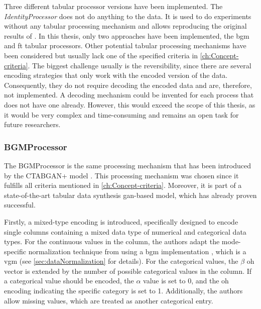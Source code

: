 Three different tabular processor versions have been implemented.
The \textit{IdentityProcessor} does not do anything to the data.
It is used to do experiments without any tabular processing mechanism and allows reproducing the original results of \cite{kotelnikov2022TabDDPMModellingTabular}.
In this thesis, only two approaches have been implemented, the \gls{bgm} and \gls{ft} tabular processors.
Other potential tabular processing mechanisms have been considered but usually lack one of the specified criteria in \autoref{ch:Concept-criteria}.
The biggest challenge usually is the reversibility, since there are several encoding strategies that only work with the encoded version of the data.
Consequently, they do not require decoding the encoded data and are, therefore, not implemented.
A decoding mechanism could be invented for each process that does not have one already.
However, this would exceed the scope of this thesis, as it would be very complex and time-consuming and remains an open task for future researchers.

\subsubsection{BGMProcessor}
\label{ch:BGMProcessor}

The BGMProcessor is the same processing mechanism that has been introduced by the CTABGAN+ model \cite{zhao2022CTABGANEnhancingTabular}.
This processing mechanism was chosen since it fulfills all criteria mentioned in \autoref{ch:Concept-criteria}.
Moreover, it is part of a state-of-the-art tabular data synthesis \gls{gan}-based model, which has already proven successful.

Firstly, a mixed-type encoding is introduced, specifically designed to encode single columns containing a mixed data type of numerical and categorical data types.
For the continuous values in the column, the authors adapt the mode-specific normalization technique from \cite{xu2019ModelingTabularData} using a \gls{bgm} implementation \cite{scikit-learndevelopers2023BayesianGaussianMixture}, which is a \gls{vgm} (see \autoref{sec:dataNormalization} for details).
For the categorical values, the $\beta$ \gls{oh} vector is extended by the number of possible categorical values in the column.
If a categorical value should be encoded, the $\alpha$ value is set to 0, and the \gls{oh} encoding indicating the specific category is set to 1.
Additionally, the authors allow missing values, which are treated as another categorical entry.

